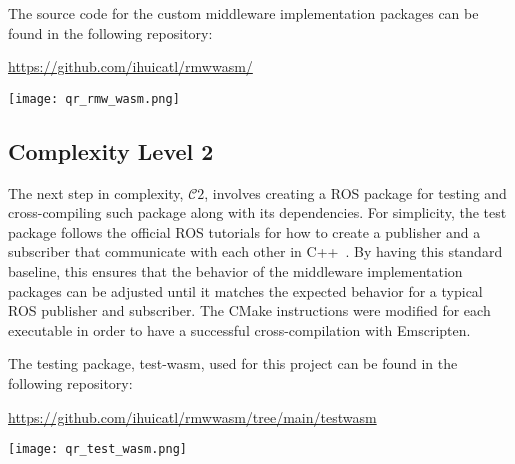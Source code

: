         \vspace{0.5em}
        \begin{tcolorbox}[title=Example 1]
            \begin{minipage}[t]{0.87\linewidth}
                \vspace*{0pt}
                The source code for the custom middleware implementation packages can be found in the following repository:

                \href{https://github.com/ihuicatl/rmw_wasm/}{\textsf{https://github.com/ihuicatl/rmw\smallunderscore wasm/}}
            \end{minipage}\hfill%
            \begin{minipage}[t]{0.1\linewidth}
                \vspace*{0pt}
                \texttt{[image: qr\_rmw\_wasm.png]}
            \end{minipage}
        \end{tcolorbox}

        \subsection{Complexity Level 2}

        The next step in complexity, $\mathcal{C}2$, involves creating a \ac{ROS} package for testing and cross-compiling such package along with its dependencies. For simplicity, the test package follows the official \ac{ROS} tutorials for how to create a publisher and a subscriber that communicate with each other in C++~\cite{humbletutorial}. By having this standard baseline, this ensures that the behavior of the middleware implementation packages can be adjusted until it matches the expected behavior for a typical \ac{ROS} publisher and subscriber. The CMake instructions were modified for each executable in order to have a successful cross-compilation with Emscripten. 

        \vspace{0.5em}
        \begin{tcolorbox}[title=Example 2]
            \begin{minipage}[t]{0.87\linewidth}
                \vspace*{0pt}
                The testing package, \textsf{test-wasm}, used for this project can be found in the following repository:

                \href{https://github.com/ihuicatl/rmw_wasm/tree/main/test_wasm}{\textsf{https://github.com/ihuicatl/rmw\smallunderscore wasm/tree/main/test\smallunderscore wasm}}
            \end{minipage}\hfill%
            \begin{minipage}[t]{0.1\linewidth}
                \vspace*{0pt}
                \texttt{[image: qr\_test\_wasm.png]}
            \end{minipage}
        \end{tcolorbox}

